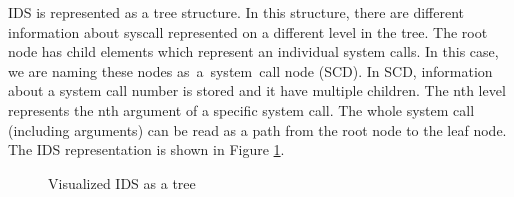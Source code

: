 IDS is represented as a tree structure.
In this structure, there are different information about syscall represented on a different level in the tree.
The root node has child elements which represent an individual system calls.
In this case, we are naming these nodes as~a~system~call node (SCD).
In SCD, information about a system call number is stored and it have multiple children.
The nth level represents the nth argument of a specific system call.
The whole system call (including arguments) can be read as a path from the root node to the leaf node.
The IDS representation is shown in Figure \ref{fig:tikz:IDStree}.

\begin{figure}[H]
\centering
  \caption{Visualized IDS as a tree}
  \label{fig:tikz:IDStree}
\end{figure}


